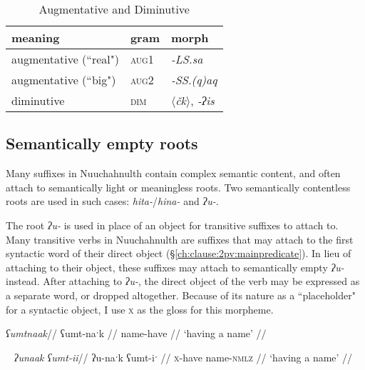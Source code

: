 \begin{table}[ht]
\centering
\caption{Augmentative and Diminutive}
\label{table:augdim}
\begin{tabular}{lll}
meaning                            & gram               & morph                                         \\ \hline
\multicolumn{1}{|l|}{augmentative (``real")} & \multicolumn{1}{l|}{\textsc{aug1}}   & \multicolumn{1}{l|}{\textit{-LS.sa}}                   \\ \hline
\multicolumn{1}{|l|}{augmentative (``big")} & \multicolumn{1}{l|}{\textsc{aug2}}   & \multicolumn{1}{l|}{\textit{-SS.(q)aq}}                   \\ \hline
\multicolumn{1}{|l|}{diminutive}   & \multicolumn{1}{l|}{\textsc{dim}} & \multicolumn{1}{l|}{\textit{$\langle$čk$\rangle$}, \textit{-ʔis}} \\ \hline
\end{tabular}
\end{table}

\subsection{Semantically empty roots} \label{sec:empty}

Many suffixes in Nuuchahnulth contain complex semantic content, and often attach to semantically light or meaningless roots. Two semantically contentless roots are used in such cases: \textit{hita-}/\textit{hina-} and \textit{ʔu-}.

The root \textit{ʔu-} is used in place of an object for transitive suffixes to attach to. Many transitive verbs in Nuuchahnulth are suffixes that may attach to the first syntactic word of their direct object (\S\ref{ch:clause:2pv:mainpredicate}). In lieu of attaching to their object, these suffixes may attach to semantically empty \textit{ʔu-} instead. After attaching to \textit{ʔu-}, the direct object of the verb may be expressed as a separate word, or dropped altogether. Because of its nature as a ``placeholder" for a syntactic object, I use \textsc{x} as the gloss for this morpheme.

\ex \label{havename1}
\begingl
\glpreamble \textit{ʕumtnaak}//
\gla ʕumt-naˑk //
\glb name-have //
\glft `having a name' //
\endgl
\xe

\ex~ \label{havename2}
\begingl
\glpreamble \textit{ʔunaak ʕumt-ii}//
\gla ʔu-naˑk ʕumt-iˑ //
\glb \textsc{x}-have name-\textsc{nmlz} //
\glft `having a name' //
\endgl
\xe

